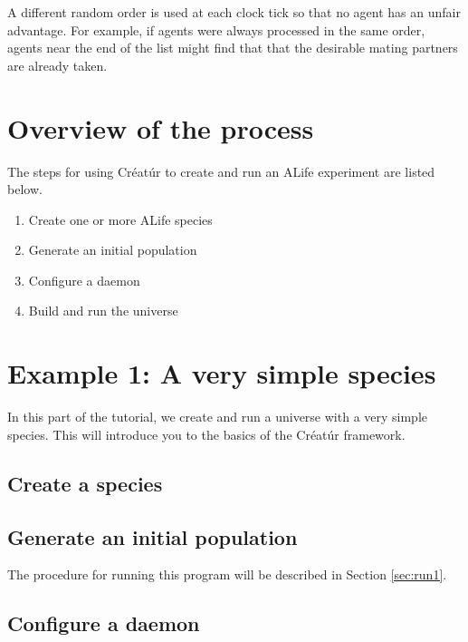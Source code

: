 \documentclass[a4paper,10pt]{report}
\begin{document}
\begin{itemize}
A different random order is used at each clock tick
so that no agent has an unfair advantage.
For example, if agents were always processed in the same order, 
agents near the end of the list might find that that the desirable mating
partners are already taken.

\chapter{Overview of the process}

The steps for using Créatúr to create and run an ALife experiment
are listed below.

\begin{enumerate}
\item Create one or more ALife species
\item Generate an initial population
\item Configure a daemon
\item Build and run the universe
\end {enumerate}

\chapter{Example 1: A very simple species}
\label{sec:rock}

In this part of the tutorial, we create and run a universe
with a very simple species.
This will introduce you to the basics of the Créatúr framework.

\section{Create a species}
\label{sec:species1}



\section{Generate an initial population}
\label{sec:pop1}



The procedure for running this program will be described in Section 
\ref{sec:run1}.

\section{Configure a daemon}
\label{sec:daemon1}


\end{itemize}
\end{document}
